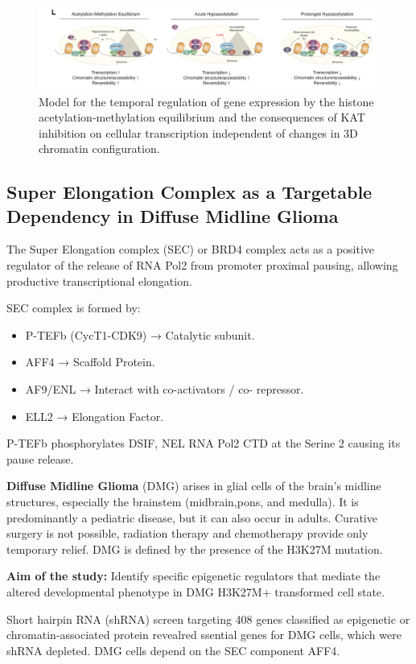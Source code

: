 \begin{figure}
\centering
\includegraphics[width=\textwidth]{../_resources/Screen_Shot_2022-12-20_at_12-01-08.png}
\caption{Model for the temporal regulation of gene expression by the histone acetylation-methylation equilibrium and the consequences of KAT inhibition on cellular transcription independent of changes in 3D chromatin configuration.}
\end{figure}

\subsection{Super Elongation Complex as a Targetable Dependency in Diffuse Midline Glioma}
The Super Elongation complex (SEC) or BRD4 complex acts as
a positive regulator of the release of RNA Pol2 from
promoter proximal pausing, allowing productive
transcriptional elongation.

SEC complex is formed by:
\begin{itemize}
\tightlist
\item P-TEFb (CycT1-CDK9) → Catalytic subunit.
\item AFF4 → Scaffold Protein.
\item AF9/ENL → Interact with co-activators / co-
repressor.
\item ELL2 → Elongation Factor.
\end{itemize}

P-TEFb phosphorylates DSIF, NEL RNA Pol2 CTD at the Serine 2 causing its pause release.

\textbf{Diffuse Midline Glioma} (DMG) arises in glial cells of the brain’s midline
structures, especially the brainstem (midbrain,pons, and medulla).  It is predominantly a pediatric disease, but it can
also occur in adults.
Curative surgery is not possible, radiation therapy and chemotherapy provide only temporary relief.
DMG is defined by the presence of the H3K27M mutation.

\textbf{Aim of the study:} Identify specific epigenetic regulators that mediate the
altered developmental phenotype in DMG H3K27M+
transformed cell state.

Short hairpin RNA (shRNA) screen targeting 408 genes classified as epigenetic or chromatin-associated
protein revealred ssential genes for DMG cells, which were shRNA depleted.  DMG cells depend on the SEC component AFF4.

